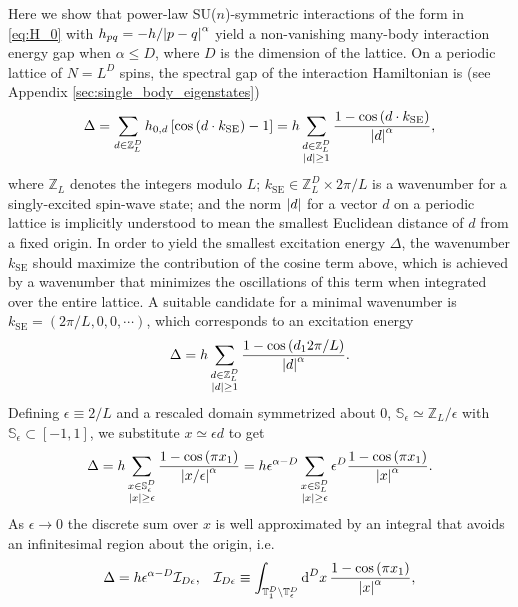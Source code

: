 \documentclass[nofootinbib,notitlepage,11pt]{revtex4-2}
\renewcommand{\t}{\text} %
\newcommand{\f}[2]{\dfrac{#1}{#2}} %
\newcommand{\p}[1]{\left(#1\right)} %
\renewcommand{\sp}[1]{\left[#1\right]} %
\renewcommand{\c}{\cdot} %
\newcommand{\1}{\mathds{1}}
\renewcommand{\d}{\text{d}}
\newcommand{\I}{\mathcal{I}}
\renewcommand{\SS}{\mathbb{S}}
\newcommand{\TT}{\mathbb{T}}
\newcommand{\ZZ}{\mathbb{Z}}
\begin{document}
Here we show that power-law SU($n$)-symmetric interactions of the form
in \eqref{eq:H_0} with $h_{pq}=-h/\abs{p-q}^\alpha$ yield a
non-vanishing many-body interaction energy gap when $\alpha\le D$,
where $D$ is the dimension of the lattice.  On a periodic lattice of
$N=L^D$ spins, the spectral gap of the interaction Hamiltonian is (see
Appendix \ref{sec:single_body_eigenstates})
\begin{align}
  \Delta
  = \sum_{d\in\ZZ_L^D} h_{0,d} \sp{\cos\p{d \c k_{\t{SE}}}-1}
  = h \sum_{\substack{d\in\ZZ_L^D\\\abs{d}\ge1}}
  \f{1-\cos\p{d \c k_{\t{SE}}}}{\abs{d}^\alpha},
\end{align}
where $\ZZ_L$ denotes the integers modulo $L$;
$k_{\t{SE}}\in\ZZ_L^D\times2\pi/L$ is a wavenumber for a
singly-excited spin-wave state; and the norm $\abs{d}$ for a vector
$d$ on a periodic lattice is implicitly understood to mean the
smallest Euclidean distance of $d$ from a fixed origin.  In order to
yield the smallest excitation energy $\Delta$, the wavenumber
$k_{\t{SE}}$ should maximize the contribution of the cosine term
above, which is achieved by a wavenumber that minimizes the
oscillations of this term when integrated over the entire lattice.  A
suitable candidate for a minimal wavenumber is
$k_{\t{SE}}=\p{2\pi/L,0,0,\cdots}$, which corresponds to an excitation
energy
\begin{align}
  \Delta = h \sum_{\substack{d\in\ZZ_L^D\\\abs{d}\ge1}}
  \f{1-\cos\p{d_12\pi/L}}{\abs{d}^\alpha}.
\end{align}
Defining $\epsilon\equiv2/L$ and a rescaled domain symmetrized about
$0$, $\SS_\epsilon\simeq\ZZ_L/\epsilon$ with
$\SS_\epsilon\subset\sp{-1,1}$, we substitute $x\simeq\epsilon d$ to
get
\begin{align}
  \Delta
  = h \sum_{\substack{x\in\SS_\epsilon^D\\\abs{x}\ge\epsilon}}
  \f{1-\cos\p{\pi x_1}}{\abs{x/\epsilon}^\alpha}
  = h \epsilon^{\alpha-D} \sum_{\substack{x\in\SS_L^D\\\abs{x}\ge\epsilon}}
  \epsilon^D \f{1-\cos\p{\pi x_1}}{\abs{x}^\alpha}.
\end{align}
As $\epsilon\to0$ the discrete sum over $x$ is well approximated by an
integral that avoids an infinitesimal region about the origin, i.e.
\begin{align}
  \Delta = h \epsilon^{\alpha-D} \I_{D\epsilon},
  &&
  \I_{D\epsilon}
  \equiv \int_{\TT_1^D\setminus\TT_\epsilon^D} \d^Dx\,
  \f{1-\cos\p{\pi x_1}}{\abs{x}^\alpha},
\end{align}
\end{document}
